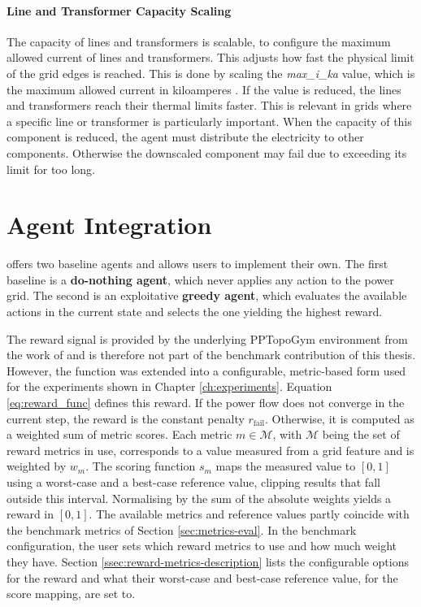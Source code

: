 \paragraph{Line and Transformer Capacity Scaling} The capacity of lines and transformers is scalable, to configure the maximum allowed current of lines and transformers. This adjusts how fast the physical limit of the grid edges is reached. This is done by scaling the \textit{max\_i\_ka} value, which is the maximum allowed current in kiloamperes \cite{pandapower_docs}. If the value is reduced, the lines and transformers reach their thermal limits faster. This is relevant in grids where a specific line or transformer is particularly important. When the capacity of this component is reduced, the agent must distribute the electricity to other components. Otherwise the downscaled component may fail due to exceeding its limit for too long.



\section{Agent Integration}\label{sec:agent-integration}
\benchmark offers two baseline agents and allows users to implement their own. The first baseline is a \textbf{do-nothing agent}, which never applies any action to the power grid. The second is an exploitative \textbf{greedy agent}, which evaluates the available actions in the current state and selects the one yielding the highest reward.

The reward signal is provided by the underlying PPTopoGym environment from the work of \citet{pptopogym} and is therefore not part of the benchmark contribution of this thesis. However, the function was extended into a configurable, metric-based form used for the experiments shown in Chapter \ref{ch:experiments}. Equation \ref{eq:reward_func} defines this reward. If the power flow does not converge in the current step, the reward is the constant penalty $r_{\mathrm{fail}}$. Otherwise, it is computed as a weighted sum of metric scores. Each metric $m \in \mathcal{M}$, with $\mathcal{M}$ being the set of reward metrics in use, corresponds to a value measured from a grid feature and is weighted by $w_m$. The scoring function $s_m$ maps the measured value to $[0,1]$ using a worst-case and a best-case reference value, clipping results that fall outside this interval. Normalising by the sum of the absolute weights yields a reward in $[0,1]$. The available metrics and reference values partly coincide with the benchmark metrics of Section \ref{sec:metrics-eval}. In the benchmark configuration, the user sets which reward metrics to use and how much weight they have. Section \ref{ssec:reward-metrics-description} lists the configurable options for the reward and what their worst-case and best-case reference value, for the score mapping, are set to.

